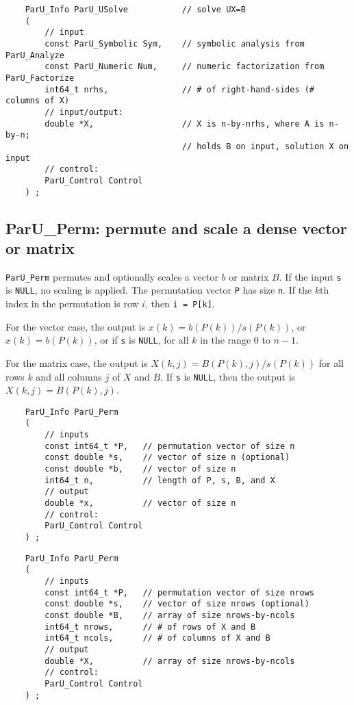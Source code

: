 \documentclass[12pt]{article}
\begin{document}
    {\footnotesize
    \begin{verbatim}
    ParU_Info ParU_USolve           // solve UX=B
    (
        // input
        const ParU_Symbolic Sym,    // symbolic analysis from ParU_Analyze
        const ParU_Numeric Num,     // numeric factorization from ParU_Factorize
        int64_t nrhs,               // # of right-hand-sides (# columns of X)
        // input/output:
        double *X,                  // X is n-by-nrhs, where A is n-by-n;
                                    // holds B on input, solution X on input
        // control:
        ParU_Control Control
    ) ; \end{verbatim} }

\subsection{{\sf ParU\_Perm}: permute and scale a dense vector or matrix}
\label{perm}

    \verb'ParU_Perm' permutes and optionally scales a vector $b$ or matrix $B$.
    If the input \verb's' is \verb'NULL', no scaling is applied.  The
    permutation vector \verb'P' has size \verb'n'.  If the $k$th index in the
    permutation is row $i$, then \verb'i = P[k]'.

    For the vector case, the output is $x(k) = b(P(k)) / s(P(k))$, or
    $x(k) = b(P(k))$, or if \verb's' is \verb'NULL', for all $k$ in the range 0
    to $n-1$.

    For the matrix case, the output is $X(k,j) = B(P(k),j) / s(P(k))$ for all
    rows $k$ and all columns $j$ of $X$ and $B$.  If \verb's' is \verb'NULL',
    then the output is $X(k,j) = B(P(k),j)$.

    {\footnotesize
    \begin{verbatim}
    ParU_Info ParU_Perm
    (
        // inputs
        const int64_t *P,   // permutation vector of size n
        const double *s,    // vector of size n (optional)
        const double *b,    // vector of size n
        int64_t n,          // length of P, s, B, and X
        // output
        double *x,          // vector of size n
        // control:
        ParU_Control Control
    ) ; \end{verbatim} }

    {\footnotesize
    \begin{verbatim}
    ParU_Info ParU_Perm
    (
        // inputs
        const int64_t *P,   // permutation vector of size nrows
        const double *s,    // vector of size nrows (optional)
        const double *B,    // array of size nrows-by-ncols
        int64_t nrows,      // # of rows of X and B
        int64_t ncols,      // # of columns of X and B
        // output
        double *X,          // array of size nrows-by-ncols
        // control:
        ParU_Control Control
    ) ; \end{verbatim} }
\end{document}

